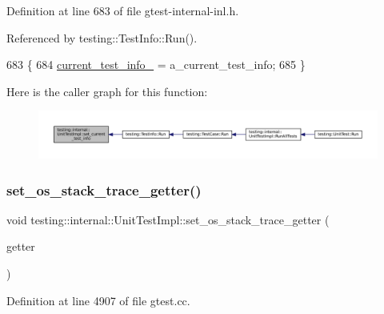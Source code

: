 Definition at line 683 of file gtest-\/internal-\/inl.\+h.



Referenced by testing\+::\+Test\+Info\+::\+Run().


\begin{DoxyCode}
683                                                             \{
684     \hyperlink{classtesting_1_1internal_1_1UnitTestImpl_a56128aac0fb5be45993715d1130b0610}{current\_test\_info\_} = a\_current\_test\_info;
685   \}
\end{DoxyCode}
Here is the caller graph for this function\+:
\nopagebreak
\begin{figure}[H]
\begin{center}
\leavevmode
\includegraphics[width=350pt]{classtesting_1_1internal_1_1UnitTestImpl_ab72211c99ce4427dfb472d6ecea62989_icgraph}
\end{center}
\end{figure}
\mbox{\label{classtesting_1_1internal_1_1UnitTestImpl_a3306f7d2b19bca54b841006e4a2e0260}} 
\subsubsection{\texorpdfstring{set\+\_\+os\+\_\+stack\+\_\+trace\+\_\+getter()}{set\_os\_stack\_trace\_getter()}}
{\footnotesize\ttfamily void testing\+::internal\+::\+Unit\+Test\+Impl\+::set\+\_\+os\+\_\+stack\+\_\+trace\+\_\+getter (\begin{DoxyParamCaption}\item[{\hyperlink{classtesting_1_1internal_1_1OsStackTraceGetterInterface}{Os\+Stack\+Trace\+Getter\+Interface} $\ast$}]{getter }\end{DoxyParamCaption})}



Definition at line 4907 of file gtest.\+cc.



